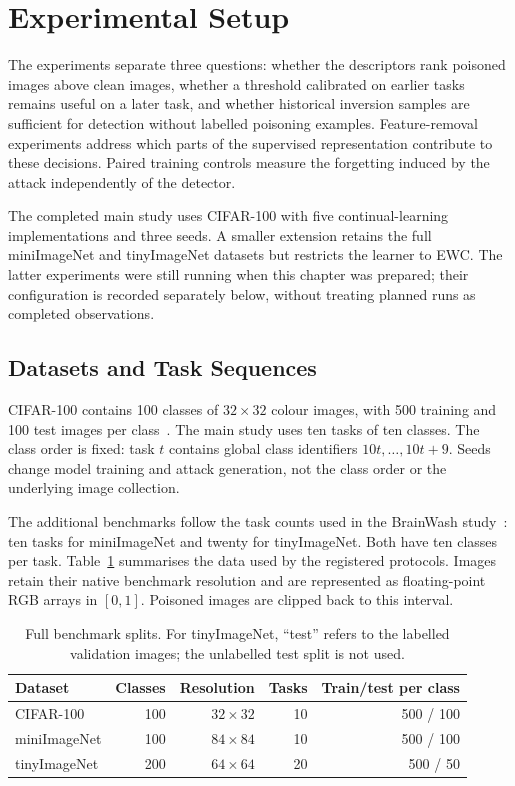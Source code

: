 
\section{Experimental Setup}
\label{sec:experimental-setup}

The experiments separate three questions: whether the descriptors rank
poisoned images above clean images, whether a threshold calibrated on earlier
tasks remains useful on a later task, and whether historical inversion
samples are sufficient for detection without labelled poisoning examples.
Feature-removal experiments address which parts of the supervised
representation contribute to these decisions. Paired training controls
measure the forgetting induced by the attack independently of the detector.

The completed main study uses CIFAR-100 with five continual-learning
implementations and three seeds. A smaller extension retains the full
miniImageNet and tinyImageNet datasets but restricts the learner to EWC.
The latter experiments were still running when this chapter was prepared;
their configuration is recorded separately below, without treating planned
runs as completed observations.

\subsection{Datasets and Task Sequences}
\label{subsec:setup-datasets}

CIFAR-100 contains 100 classes of $32\times32$ colour images, with 500
training and 100 test images per class~\cite{krizhevsky2009learning}.
The main study uses ten tasks of ten classes. The class order is fixed:
task $t$ contains global class identifiers $10t,\ldots,10t+9$. Seeds change
model training and attack generation, not the class order or the underlying
image collection.

The additional benchmarks follow the task counts used in the BrainWash
study~\cite{abbasi2024brainwash}: ten tasks for miniImageNet and twenty for
tinyImageNet. Both have ten classes per task. Table~\ref{tab:setup-datasets}
summarises the data used by the registered protocols. Images retain their
native benchmark resolution and are represented as floating-point RGB
arrays in $[0,1]$. Poisoned images are clipped back to this interval.

\begin{table}[tbp]
\centering
\small
\begin{tabular}{lrrrr}
\toprule
Dataset & Classes & Resolution & Tasks & Train/test per class\\
\midrule
CIFAR-100 & 100 & $32\times32$ & 10 & 500 / 100\\
miniImageNet & 100 & $84\times84$ & 10 & 500 / 100\\
tinyImageNet & 200 & $64\times64$ & 20 & 500 / 50\\
\bottomrule
\end{tabular}
\caption{Full benchmark splits. For tinyImageNet, ``test'' refers to the
labelled validation images; the unlabelled test split is not used.}
\label{tab:setup-datasets}
\end{table}


